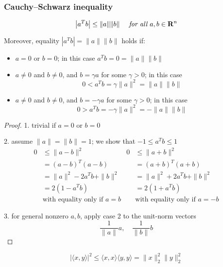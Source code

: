\subsubsection{Cauchy–Schwarz inequality}

\begin{theorem}
    $$ \left|a^{T} b\right| \leq\|a\|\|b\| \quad \term{ for all } a, b \in \mathbf{R}^{n} $$
\end{theorem}

\begin{corollary}
    Moreover, equality $ \left|a^{T} b\right|=\|a\|\|b\| $ holds if:

\begin{itemize}
    \item $ a=0 $ or $ b=0 $; in this case $ a^{T} b=0=\|a\|\|b\| $
    \item $ a \neq 0 $ and $ b \neq 0 $, and $ b=\gamma a $ for some $ \gamma>0 $; in this case
    $$
    0<a^{T} b=\gamma\|a\|^{2}=\|a\|\|b\|
    $$

    \item $ a \neq 0 $ and $ b \neq 0 $, and $ b=-\gamma a $ for some $ \gamma>0 $; in this case
    $$
    0>a^{T} b=-\gamma\|a\|^{2}=-\|a\|\|b\|
    $$
\end{itemize}
\end{corollary}

\begin{proof}
    1. trivial if $ a=0 $ or $ b=0 $

2. assume $ \|a\|=\|b\|=1 $; we show that $ -1 \leq a^{T} b \leq 1 $
$$
\begin{array}{rlrl}
0 & \leq\|a-b\|^{2} & 0 & \leq\|a+b\|^{2} \\
& =(a-b)^{T}(a-b) & & =(a+b)^{T}(a+b) \\
& =\|a\|^{2}-2 a^{T} b+\|b\|^{2} & & =\|a\|^{2}+2 a^{T} b+\|b\|^{2} \\
& =2\left(1-a^{T} b\right) & & =2\left(1+a^{T} b\right)\\
 & \text{with equality only if }a=b &  & \text{with equality only if }a=-b
\end{array}
$$

3. for general nonzero $ a, b $, apply case 2 to the unit-norm vectors
$$
\frac{1}{\|a\|} a, \quad \frac{1}{\|b\|} b
$$
\end{proof}



\begin{corollary}
    $$ |\langle x, y\rangle|^{2} \leq\langle x, x\rangle\langle y, y\rangle=\|x\|_{2}^{2}\|y\|_{2}^{2} $$
\end{corollary}



